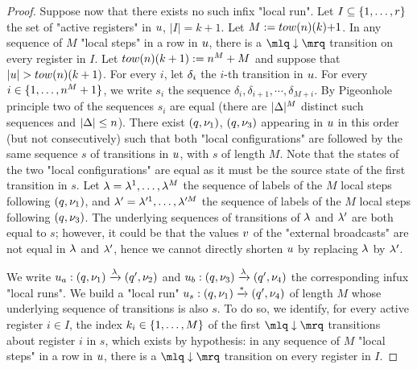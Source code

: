 \begin{proof}
Suppose now that there exists no such infix "local run".
Let $I \subseteq \{1,\dots,r\}$ the set of "active registers" in $u$, $|I| = k+1$. Let $M:= \towerfun(n)(k){+}1$. 
In any sequence of $M$ "local steps" in a row in $u$, 
there is a $\quotemarks{\enregact}$ transition on every register in $I$. Let $\towerfun(n)(k+1) := n^{M}+M$ and suppose that $\length{\localrun} > \towerfun(n)(k+1)$. For every $i$, let $\delta_i$ the $i$-th transition in $u$.
 For every $i \in \{1,\dots,n^M+1\}$, we write $s_i$ the sequence $\delta_i, \delta_{i+1}, \cdots, \delta_{M{+}i}$.
By Pigeonhole principle two of the sequences $s_i$ are equal (there are $|\Delta|^{M}$ distinct such sequences and $|\Delta| \leq n$). 
There exist $(q, \nu_1)$, $(q, \nu_3)$ appearing in $u$ in this order (but not consecutively) such that both "local configurations" are followed by the same sequence $s$ of transitions in $u$, with $s$ of length $M$. Note that the states of the two "local configurations" are equal as it must be the source state of the first transition in $s$. Let $\lambda = \lambda^1, \dots, \lambda^M$ the sequence of labels of the $M$ local steps following $(q, \nu_1)$, and $\lambda' = \lambda'^1, \dots, \lambda'^M$ the sequence of labels of the $M$ local steps following $(q, \nu_3)$. The underlying sequences of transitions of $\lambda$ and $\lambda'$ are both equal to $s$; however, it could be that the values $v$ of the "external broadcasts" are not equal in $\lambda$ and $\lambda'$, hence we cannot directly shorten $u $ by replacing $\lambda$ by $\lambda'$. 	

We write $u_a: (q, \nu_1) \xrightarrow{\lambda} (q', \nu_2)$ and $u_b: (q, \nu_3) \xrightarrow{\lambda} (q', \nu_4)$ the corresponding infux "local runs". 
We build a "local run" $u_s: (q, \nu_1) \xrightarrow{*} (q', \nu_4)$ of length $M$ whose underlying sequence of transitions is also $s$. To do so, we identify, for every active register $i \in I$, the index $k_i \in \{1,\dots,M\}$ of the first $\quotemarks{\enregact}$ transitions about register $i$ in $s$, which exists by hypothesis: in any sequence of $M$ "local steps" in a row in $u$, 
there is a $\quotemarks{\enregact}$ transition on every register in $I$. 


\end{proof}
